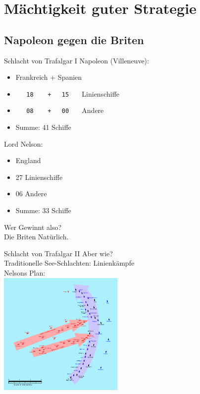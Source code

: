 \section{Mächtigkeit guter Strategie}

\subsection{Napoleon gegen die Briten}

\begin{frame}[c, fragile]{Schlacht von Trafalgar I}
    Napoleon (Villeneuve):
    \begin{itemize}
        \item Frankreich + Spanien
        \item<2-> \verb!   18    +   15   ! Linienschiffe
        \item<2-> \verb!   08    +   00   ! Andere
        \item<3-> Summe: 41 Schiffe
    \end{itemize}

    Lord Nelson:
    \begin{itemize}
        \item England
        \item<2-> 27 Linienschiffe
        \item<2-> 06 Andere
        \item<3-> Summe: 33 Schiffe
    \end{itemize}
    \pause
    \pause
    \pause

    Wer Gewinnt also? \\
    \ifonline Die Briten Natürlich. \fi
\end{frame}


\begin{frame}{Schlacht von Trafalgar II}
    Aber wie? \\
    \pause
    Traditionelle See-Schlachten: Linienkämpfe \\
    \pause
    Nelsons Plan: \\
    \includegraphics[height=6cm]{Trafalgar-1200hr.jpg}
\end{frame}

